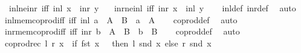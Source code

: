 \begin{isabellebody}
\ \ inl{\isacharunderscore}{\kern0pt}ne{\isacharunderscore}{\kern0pt}inr\ {\isacharbrackleft}{\kern0pt}iff{\isacharbrackright}{\kern0pt}{\isacharcolon}{\kern0pt}\ {\isachardoublequoteopen}inl\ x\ {\isasymnoteq}\ inr\ y{\isachardoublequoteclose}\ \isanewline
\ \ inr{\isacharunderscore}{\kern0pt}ne{\isacharunderscore}{\kern0pt}inl\ {\isacharbrackleft}{\kern0pt}iff{\isacharbrackright}{\kern0pt}{\isacharcolon}{\kern0pt}\ {\isachardoublequoteopen}inr\ x\ {\isasymnoteq}\ inl\ y{\isachardoublequoteclose}\isanewline
%
\isadelimproof
\ \ %
\endisadelimproof
%
\isatagproof
{}\isamarkupfalse%
\ inl{\isacharunderscore}{\kern0pt}def\ inr{\isacharunderscore}{\kern0pt}def\ \isamarkupfalse%
\ auto%
\endisatagproof
{\isafoldproof}%
%
\isadelimproof
\isanewline
%
\endisadelimproof
\isanewline
{}\isamarkupfalse%
\ inl{\isacharunderscore}{\kern0pt}mem{\isacharunderscore}{\kern0pt}coprod{\isacharunderscore}{\kern0pt}iff\ {\isacharbrackleft}{\kern0pt}iff{\isacharbrackright}{\kern0pt}{\isacharcolon}{\kern0pt}\ {\isachardoublequoteopen}inl\ a\ {\isasymin}\ A\ {\isasymCoprod}\ B\ {\isasymlongleftrightarrow}\ a\ {\isasymin}\ A{\isachardoublequoteclose}\isanewline
%
\isadelimproof
\ \ %
\endisadelimproof
%
\isatagproof
{}\isamarkupfalse%
\ coprod{\isacharunderscore}{\kern0pt}def\ \isamarkupfalse%
\ auto%
\endisatagproof
{\isafoldproof}%
%
\isadelimproof
\isanewline
%
\endisadelimproof
\isanewline
{}\isamarkupfalse%
\ inr{\isacharunderscore}{\kern0pt}mem{\isacharunderscore}{\kern0pt}coprod{\isacharunderscore}{\kern0pt}iff\ {\isacharbrackleft}{\kern0pt}iff{\isacharbrackright}{\kern0pt}{\isacharcolon}{\kern0pt}\ {\isachardoublequoteopen}inr\ b\ {\isasymin}\ A\ {\isasymCoprod}\ B\ {\isasymlongleftrightarrow}\ b\ {\isasymin}\ B{\isachardoublequoteclose}\isanewline
%
\isadelimproof
\ \ %
\endisadelimproof
%
\isatagproof
{}\isamarkupfalse%
\ coprod{\isacharunderscore}{\kern0pt}def\ \isamarkupfalse%
\ auto%
\endisatagproof
{\isafoldproof}%
%
\isadelimproof
\isanewline
%
\endisadelimproof
\isanewline
{}\isamarkupfalse%
\ {\isachardoublequoteopen}coprod{\isacharunderscore}{\kern0pt}rec\ l\ r\ x\ {\isacharequal}{\kern0pt}\ {\isacharparenleft}{\kern0pt}if\ fst\ x\ {\isacharequal}{\kern0pt}\ {\isacharbraceleft}{\kern0pt}{\isacharbraceright}{\kern0pt}\ then\ l\ {\isacharparenleft}{\kern0pt}snd\ x{\isacharparenright}{\kern0pt}\ else\ r\ {\isacharparenleft}{\kern0pt}snd\ x{\isacharparenright}{\kern0pt}{\isacharparenright}{\kern0pt}{\isachardoublequoteclose}\isanewline

\end{isabellebody}

